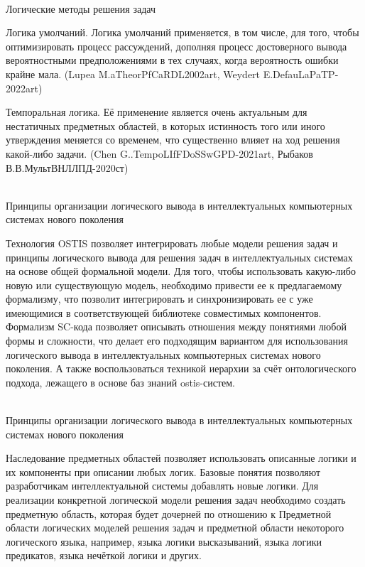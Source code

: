 \begin{frame}{\\Логические методы решения задач}
    \vspace{10mm}
    \begin{scn}
    \begin{textitemize}
        \item Логика умолчаний. Логика умолчаний применяется, в том числе, для того, чтобы оптимизировать процесс рассуждений, дополняя процесс достоверного вывода вероятностными предположениями в тех случаях, когда вероятность ошибки крайне мала. (Lupea M.aTheorPfCaRDL2002art, Weydert E.DefauLaPaTP-2022art)
        \item Темпоральная логика. Её применение является очень актуальным для нестатичных предметных областей, в которых истинность того или иного утверждения меняется со временем, что существенно влияет на ход решения какой-либо задачи. (Chen G..TempoLIfFDoSSwGPD-2021art, Рыбаков В.В.МультВНЛЛПД-2020ст)        
    \end{textitemize}
    \end{scn}   
\end{frame}


\begin{frame}{\\Принципы организации логического вывода в интеллектуальных компьютерных системах нового поколения}
    \vspace{10mm}
    \begin{scn}
        Технология OSTIS позволяет интегрировать любые модели решения задач и принципы логического вывода для решения задач в интеллектуальных системах на основе общей формальной модели. Для того, чтобы использовать какую-либо новую или существующую модель, необходимо привести ее к предлагаемому формализму, что позволит интегрировать и синхронизировать ее с уже имеющимися в соответствующей библиотеке совместимых компонентов. Формализм SC-кода позволяет описывать отношения между понятиями любой формы и сложности, что делает его подходящим вариантом для использования логического вывода в интеллектуальных компьютерных системах нового поколения. А также воспользоваться техникой иерархии за счёт онтологического подхода, лежащего в основе баз знаний ostis-систем.
    \end{scn} 
\end{frame}

\begin{frame}{\\Принципы организации логического вывода в интеллектуальных компьютерных системах нового поколения}
    \begin{scn}
        Наследование предметных областей позволяет использовать описанные логики и их компоненты при описании любых логик. Базовые понятия позволяют разработчикам интеллектуальной системы добавлять новые логики. Для реализации конкретной логической модели решения задач необходимо создать предметную область, которая будет дочерней по отношению к Предметной области логических моделей решения задач и предметной области некоторого логического языка, например, языка логики высказываний, языка логики предикатов, языка нечёткой логики и других.
    \end{scn} 
\end{frame}

